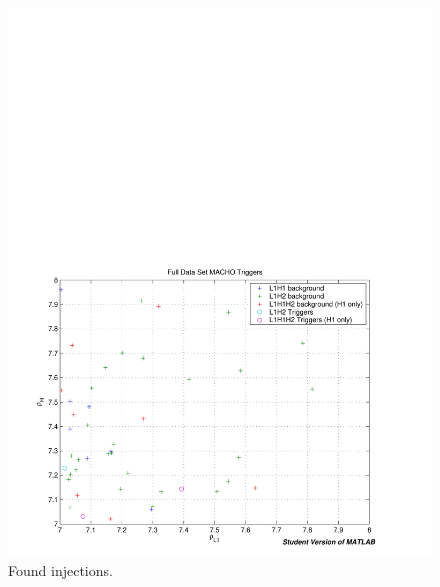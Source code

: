 \begin{figure}[p]
\begin{center}
\includegraphics[width=\textwidth]{analysis/figures/bkg_fgd_zoom}
\end{center}
\caption{\label{f:pipeline}%
Found injections.
}
\end{figure}
